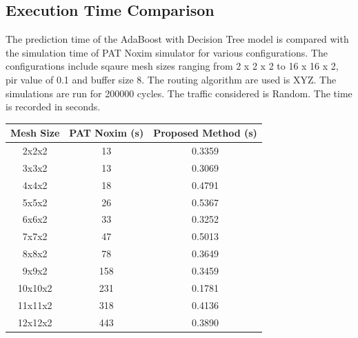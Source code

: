 \documentclass[conference]{IEEEtran}
\begin{document}
\newpage
\subsection{Execution Time Comparison}
The prediction time of the AdaBoost with Decision Tree model is compared with the simulation time of PAT Noxim simulator for various configurations. The configurations include sqaure mesh sizes ranging from 2 x 2 x 2 to 16 x 16 x 2, pir value of 0.1 and buffer size 8. The routing algorithm are used is XYZ. The simulations are run for 200000 cycles. The traffic considered is Random. The time is recorded in seconds.

\begin{table}[h!]
	\centering
	\begin{tabular}{|c|c|c|}
		\hline
		\textbf{Mesh Size} & \textbf{PAT Noxim (s)} & \textbf{Proposed Method (s)} \\ \hline
		2x2x2              & 13                                      & 0.3359                                     \\ \hline
		3x3x2              & 13                                      & 0.3069                                     \\ \hline
		4x4x2              & 18                                      & 0.4791                                     \\ \hline
		5x5x2              & 26                                      & 0.5367                                     \\ \hline
		6x6x2              & 33                                      & 0.3252                                     \\ \hline
		7x7x2              & 47                                      & 0.5013                                     \\ \hline
		8x8x2              & 78                                      & 0.3649                                     \\ \hline
		9x9x2              & 158                                     & 0.3459                                     \\ \hline
		10x10x2            & 231                                     & 0.1781                                     \\ \hline
		11x11x2            & 318                                     & 0.4136                                     \\ \hline
		12x12x2            & 443                                     & 0.3890                                     \\ \hline

\end{tabular}
\end{table}
\end{document}

